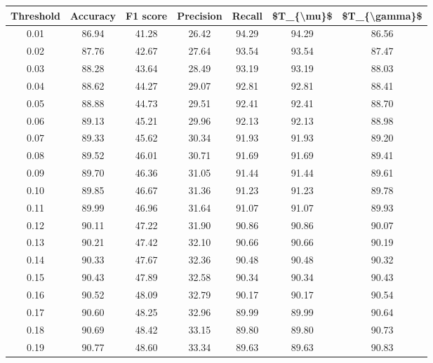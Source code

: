 \begin{tabular}{|c|c|c|c|c|c|c|}
\hline
 Threshold &  Accuracy &  F1 score &  Precision &  Recall &  \$T\_\{\textbackslash mu\}\$ &  \$T\_\{\textbackslash gamma\}\$ \\
\hline
      0.01 &     86.94 &     41.28 &      26.42 &   94.29 &      94.29 &         86.56 \\
      0.02 &     87.76 &     42.67 &      27.64 &   93.54 &      93.54 &         87.47 \\
      0.03 &     88.28 &     43.64 &      28.49 &   93.19 &      93.19 &         88.03 \\
      0.04 &     88.62 &     44.27 &      29.07 &   92.81 &      92.81 &         88.41 \\
      0.05 &     88.88 &     44.73 &      29.51 &   92.41 &      92.41 &         88.70 \\
      0.06 &     89.13 &     45.21 &      29.96 &   92.13 &      92.13 &         88.98 \\
      0.07 &     89.33 &     45.62 &      30.34 &   91.93 &      91.93 &         89.20 \\
      0.08 &     89.52 &     46.01 &      30.71 &   91.69 &      91.69 &         89.41 \\
      0.09 &     89.70 &     46.36 &      31.05 &   91.44 &      91.44 &         89.61 \\
      0.10 &     89.85 &     46.67 &      31.36 &   91.23 &      91.23 &         89.78 \\
      0.11 &     89.99 &     46.96 &      31.64 &   91.07 &      91.07 &         89.93 \\
      0.12 &     90.11 &     47.22 &      31.90 &   90.86 &      90.86 &         90.07 \\
      0.13 &     90.21 &     47.42 &      32.10 &   90.66 &      90.66 &         90.19 \\
      0.14 &     90.33 &     47.67 &      32.36 &   90.48 &      90.48 &         90.32 \\
      0.15 &     90.43 &     47.89 &      32.58 &   90.34 &      90.34 &         90.43 \\
      0.16 &     90.52 &     48.09 &      32.79 &   90.17 &      90.17 &         90.54 \\
      0.17 &     90.60 &     48.25 &      32.96 &   89.99 &      89.99 &         90.64 \\
      0.18 &     90.69 &     48.42 &      33.15 &   89.80 &      89.80 &         90.73 \\
      0.19 &     90.77 &     48.60 &      33.34 &   89.63 &      89.63 &         90.83 \\

\end{tabular}
